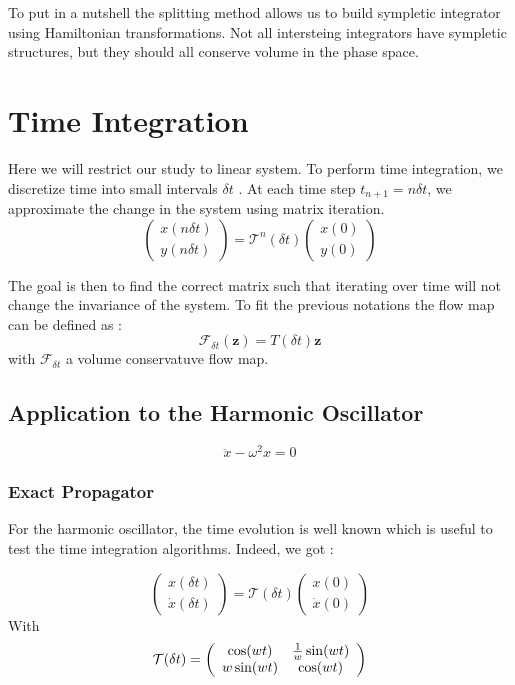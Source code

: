 \documentclass[ansiapaper]{report}
\begin{document}
\begin{multicols}{3}
	To put in a nutshell the splitting method allows us to build sympletic integrator using Hamiltonian transformations. Not all intersteing integrators have sympletic structures, but they should all conserve volume in the phase space.




	\section{Time Integration}

	Here we will restrict our study to linear system. To perform time integration, we discretize time into small intervals $\delta t$ . At each time step $t_{n+1}=n \delta t$, we approximate the change in the system using matrix iteration.
	$$ \begin{pmatrix}
			x(n\delta t) \\
			y(n\delta t)
		\end{pmatrix} = \mathcal{T}^n(\delta t) \begin{pmatrix}
			x(0) \\
			y(0)
		\end{pmatrix}$$

	The goal is then to find the correct matrix such that iterating over time will not change the invariance of the system. To fit the previous notations the flow map can be defined as :
	$$\mathcal{F}_{\delta t}(\textbf{z} ) = T(\delta t)\textbf{z} $$ with $\mathcal{F}_{\delta t}$ a volume conservatuve flow map.

	\subsection{Application to the Harmonic Oscillator}
	$$\ddot{x} - \omega^2 x = 0$$
	\subsubsection{Exact Propagator}

	For the harmonic oscillator, the time evolution is well known which is useful to test the time integration algorithms. Indeed, we got :

	$$ \begin{pmatrix}
			x(\delta t) \\
			\dot{x}(\delta  t)
		\end{pmatrix} = \mathcal{T}(\delta t) \begin{pmatrix}
			x(0) \\
			\dot{x}(0)
		\end{pmatrix}$$
	With $$\mathcal{T}(\delta t) =  \left(\begin{array}{cc}
				\cos(wt)    & \frac{1}{w}\sin(wt) \\
				\-w\sin(wt) & \cos(wt)
			\end{array}\right)$$


\end{multicols}
\end{document}
